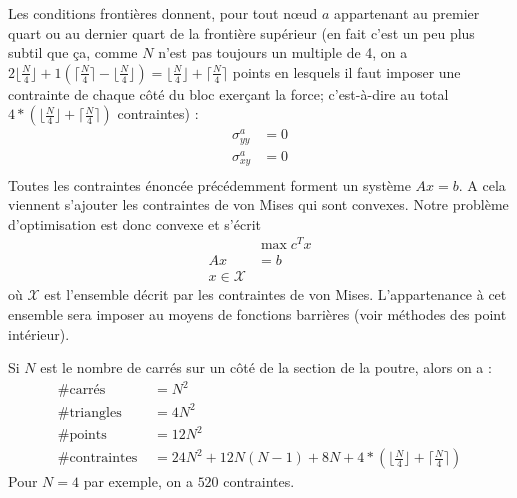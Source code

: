Les conditions frontières donnent, pour tout nœud $a$ appartenant au premier quart ou au dernier quart de la frontière supérieur (en fait c'est un peu plus subtil que ça, comme $N$ n'est pas toujours un multiple de 4, on a $2\lfloor \frac{N}{4} \rfloor + 1 \left( \lceil \frac{N}{4} \rceil - \lfloor \frac{N}{4} \rfloor \right) = \lfloor \frac{N}{4} \rfloor + \lceil \frac{N}{4} \rceil$ points en lesquels il faut imposer une contrainte de chaque côté du bloc exerçant la force; c'est-à-dire au total $4*\left(  \lfloor \frac{N}{4} \rfloor + \lceil \frac{N}{4} \rceil \right)$ contraintes) : 
\begin{align*}
\sigma_{yy}^a&= 0\\
 \sigma_{xy}^a &= 0  \\
\end{align*}
Toutes les contraintes énoncée précédemment forment un système $Ax=b$. A cela viennent s'ajouter les contraintes de von Mises qui sont convexes. Notre problème d'optimisation est donc convexe et s'écrit 
\begin{align*}
& \max c^T x\\
 Ax &= b\\
 x \in \mathcal{X}
\end{align*}
où $\mathcal{X}$ est l'ensemble décrit par les contraintes de von Mises. L'appartenance à cet ensemble sera imposer au moyens de fonctions barrières (voir méthodes des point intérieur). 


Si $N$ est le nombre de carrés sur un côté de la section de la poutre, alors on a :
\begin{align*}
\text{\# carrés  } &= N^2\\
\text{\# triangles  } &= 4N^2\\
\text{\# points  } &= 12 N^2\\
\text{\# contraintes  } &= 24N^2+12N(N-1)+8N + 4*\left(  \lfloor \frac{N}{4} \rfloor + \lceil \frac{N}{4} \rceil \right)
\end{align*}
Pour $N=4$ par exemple, on a $520$ contraintes.
